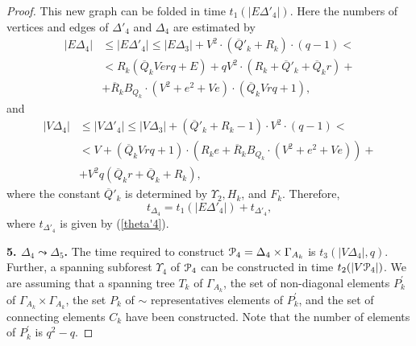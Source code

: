 \documentclass[a4paper,12pt]{article}
\newcommand{\G}{\Gamma }
\newcommand{\D}{\Delta }
\newcommand{\U}{\Upsilon }
\newcommand{\cP}{{\cal{P}}}
\numberwithin{equation}{section}
\numberwithin{figure}{section}
\begin{document}
\begin{proof}
This new graph can be folded in time $t_1(|E\D'_4|)$. Here the
numbers of vertices and edges of $\D'_4$ and $\D_4$ are estimated
by
\begin{equation}\label{etheta4}
\begin{split}
|E\D_4| &\le |E\D'_4| \le |E\D_3|+ V^2 \cdot (\overline{Q}'_k +
R_k)\cdot(q-1)<\\
&< R_k(\overline{Q}_k V e r q + E) + q V^2\cdot (R_k + \overline{Q}'_k + \overline{Q}_k r) +\\
&+ \overline{R}_k B_{Q_k} \cdot(V^2+ e^2 + Ve)\cdot(\overline{Q}_k
V r q +1),
\end{split}
\end{equation}
and
\begin{equation}\label{vtheta4}
\begin{split}
|V\D_4| &\le |V \D'_4| \le |V \D_3| +(\overline{Q}'_k+R_k-1)\cdot
V^2 \cdot(q-1)<\\
&< V + (\overline{Q}_k V rq +1)\cdot(R_k e +\overline{R}_k B_{Q_k}
\cdot(V^2 + e^2 + V e)) +\\
&+ V^2 q (\overline{Q}_k r +\overline{Q}_k +R_k) ,
\end{split}
\end{equation}
where the constant $\overline{Q}'_k$ is determined by $\U_2, H_k$, and
$F_k$.
Therefore,
\begin{equation}\label{theta4}
t_{\D_4} = t_1(|E\D'_4|) + t_{\D'_4},
\end{equation}
where $t_{\D'_4}$ is given by (\ref{theta'4}).

{\bf 5. $\D_4 \leadsto \D_5$.} The time required to construct
$\cP_4=\D_4\times \G_{A_k}$ is $t_3(|V \D_4|, q)$. Further,
 a spanning subforest $\U_4$ of $\cP_4$ can be constructed in time
$t_2(|V\cP_4|)$. We are assuming that  a spanning tree $T_k$ of
$\G_{A_k}$, the set of non-diagonal elements $P_k^\prime$ of
$\G_{A_k}\times \G_{A_k}$, the set $P_k$ of $\sim$ representatives
elements of $P_k^\prime$, and the set of connecting elements
 $C_k$ have been constructed. Note that the number of elements of $P_k^\prime$ is
$q^2-q$.



\end{proof}
\end{document}
